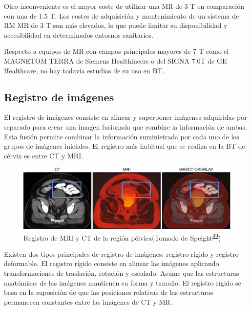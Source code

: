 \documentclass[
  a4paper,
]{scrreprt}
\begin{document}
Otro inconveniente es el mayor coste de utilizar una MR de 3 T en
comparación con una de 1.5 T. Los costes de adquisición y mantenimiento
de un sistema de RM MR de 3 T son más elevados, lo que puede limitar su
disponibilidad y accesibilidad en determinados entornos sanitarios.

Respecto a equipos de MR con campos principales mayores de 7 T como el
MAGNETOM TERRA de Siemens Healthineers o del SIGNA 7.0T de GE
Healthcare, no hay todavía estudios de su uso en BT.

\hypertarget{registro-de-imuxe1genes}{%
\subsection{Registro de imágenes}\label{registro-de-imuxe1genes}}

El registro de imágenes consiste en alinear y superponer imágenes
adquiridas por separado para crear una imagen fusionada que combine la
información de ambas. Esta fusión permite combinar la información
suministrada por cada uno de los grupos de imágenes iniciales. El
registro más habitual que se realiza en la BT de cérvix es entre CT y
MRI.

\begin{figure}

{\centering \includegraphics{img/MRI_CT_register.png}

}

\caption{Registro de MRI y CT de la región pélvica(Tomado de
Speight\textsuperscript{\protect\hyperlink{ref-speight2019}{39}})}

\end{figure}

Existen dos tipos principales de registro de imágenes: registro rígido y
registro deformable. El registro rígido consiste en alinear las imágenes
aplicando transformaciones de traslación, rotación y escalado. Asume que
las estructuras anatómicas de las imágenes mantienen su forma y tamaño.
El registro rígido se basa en la suposición de que las posiciones
relativas de las estructuras permanecen constantes entre las imágenes de
CT y MR.
\end{document}
